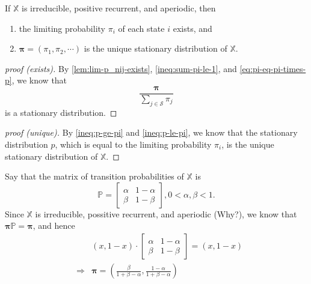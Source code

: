 \begin{theorem}
If $ \mathbb{X} $ is irreducible, positive recurrent, and aperiodic, then
\begin{enumerate}
  \item the limiting probability $ \pi_{i} $ of each state $ i $ exists, and
  \item $ \boldsymbol\pi = (\pi_{1}, \pi_{2}, \cdots) $ is the unique stationary distribution of $ \mathbb{X} $.
\end{enumerate}

\begin{proof}[proof (exists)]
By \autoref{lem:lim-p_nij-exists}, \autoref{ineq:sum-pi-le-1}, and \autoref{eq:pi-eq-pi-times-p}, we know that
\[ \frac{\boldsymbol\pi}{\sum_{j \in \mathcal{S}} \pi_{j}} \]
is a stationary distribution.
\end{proof}

\begin{comment}
By \autoref{lem:lim-p_nij-exists}, we know that the limiting probability $ \pi_{i} $ exists for all $ i \in \mathcal{S} $,
\[ \sum_{j \in \mathcal{S}} \pi_{j} \neq \infty, \text{\hspace{1em} \small (by \autoref{ineq:sum-pi-le-1})} \]
and
\[ \frac{\boldsymbol\pi}{\sum_{j \in \mathcal{S}} \pi_{j}} = \frac{\boldsymbol\pi \mathbb{P}}{\sum_{j \in \mathcal{S}} \pi_{j}}. \text{\hspace{1em} \small (by \autoref{eq:pi-eq-pi-times-p})} \]
\end{comment}

\begin{proof}[proof (unique)]
By \autoref{ineq:p-ge-pi} and \autoref{ineq:p-le-pi}, we know that the stationary distribution $ p $, which is equal to the limiting probability $ \pi_{i} $, is the unique stationary distribution of $ \mathbb{X} $.
\end{proof}
\end{theorem}

\begin{example}
Say that the matrix of transition probabilities of $ \mathbb{X} $ is
\[ \mathbb{P} = \begin{bmatrix}
  \alpha  & 1 - \alpha \\
  \beta   & 1 - \beta
\end{bmatrix}, 0 < \alpha, \beta < 1. \]
Since $ \mathbb{X} $ is irreducible, possitive recurrent, and aperiodic {\color{red} (Why?)}, we know that $ \boldsymbol\pi \mathbb{P} = \boldsymbol\pi $, and hence
\begin{eqnarray*}
& & (x, 1 - x) \cdot \begin{bmatrix}
  \alpha  & 1 - \alpha \\
  \beta   & 1 - \beta
\end{bmatrix} = (x, 1 - x) \\
& \Rightarrow & \boldsymbol\pi = \left( \frac{\beta}{1 + \beta - \alpha}, \frac{1 - \alpha}{1 + \beta - \alpha} \right)
\end{eqnarray*}
\end{example}
